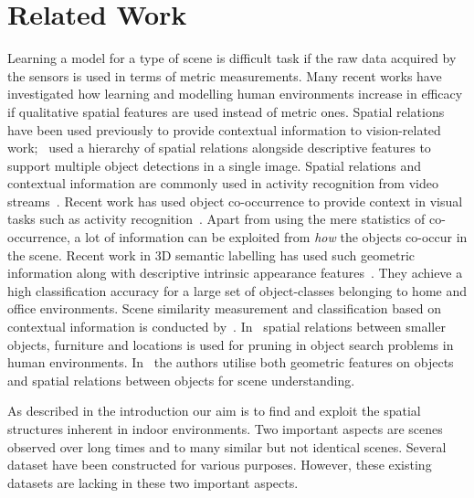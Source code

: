 \documentclass[letterpaper, 10 pt, conference]{ieeeconf}  %
\begin{document}
\section{Related Work}
\label{sec:Related Work}
Learning a model for a type of scene is difficult task if the raw data
acquired by the sensors is used in terms of metric measurements. Many
recent works have investigated how learning and modelling human
environments increase in efficacy if qualitative spatial features are
used instead of metric ones. Spatial relations have been used
previously to provide contextual information to vision-related
work;~\cite{MyungJin:CVPR2010} used a hierarchy of spatial relations
alongside descriptive features to support multiple object detections
in a single image. Spatial relations and contextual information are
commonly used in activity recognition from video
streams~\cite{Krishna:ECAI2010, Behera2012}. Recent work has used
object co-occurrence to provide context in visual tasks such as
activity recognition~\cite{Li:2012}. Apart from using the mere
statistics of co-occurrence, a lot of information can be exploited
from \textit{how} the objects co-occur in the scene. Recent work in 3D
semantic labelling has used such geometric information along with
descriptive intrinsic appearance
features~\cite{Koppula:NIPS2011}. They achieve a high classification
accuracy for a large set of object-classes belonging to home and
office environments. Scene similarity measurement and classification
based on contextual information is conducted
by~\cite{Fisher:ACMT2011}. In~\cite{Aydemir:ICRA2011} spatial
relations between smaller objects, furniture and locations is used for
pruning in object search problems in human
environments. In~\cite{Southey:2007,kasper:2011} the authors utilise
both geometric features on objects and spatial relations between
objects for scene understanding.

As described in the introduction our aim is to find and exploit the
spatial structures inherent in indoor environments. Two important
aspects are scenes observed over long times and to many similar but
not identical scenes. Several dataset have been constructed for
various purposes. However, these existing datasets are lacking in
these two important aspects.
\end{document}
